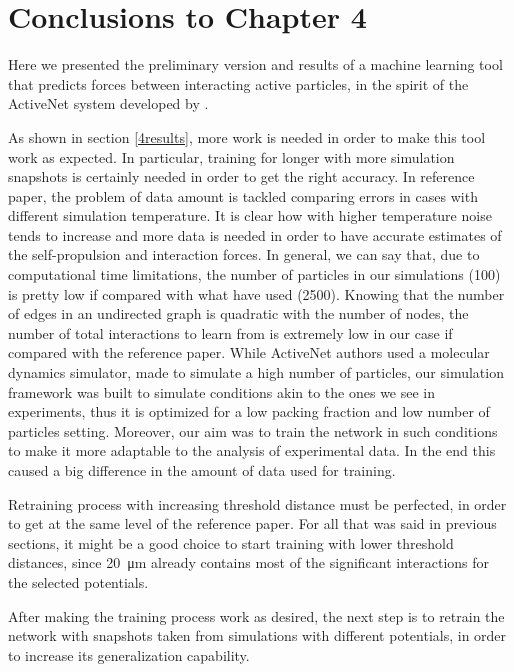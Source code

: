 \documentclass[../../master_thesis_np.tex]{subfiles}
\begin{document}
\section{Conclusions to Chapter 4}

Here we presented the preliminary version and results of a machine learning tool that predicts forces between interacting active particles, in the spirit of the ActiveNet system developed by \citeauthor{ruiz-garcia_discovering_2024}.

As shown in section \ref{4results}, more work is needed in order to make this tool work as expected.
In particular, training for longer with more simulation snapshots is certainly needed in order to get the right accuracy.
In reference paper, the problem of data amount is tackled comparing errors in cases with different simulation temperature.
It is clear how with higher temperature noise tends to increase and more data is needed in order to have accurate estimates of the self-propulsion and interaction forces.
In general, we can say that, due to computational time limitations, the number of particles in our simulations (100) is pretty low if compared with what \citeauthor{ruiz-garcia_discovering_2024} have used (2500).
Knowing that the number of edges in an undirected graph is quadratic with the number of nodes, the number of total interactions to learn from is extremely low in our case if compared with the reference paper.
While ActiveNet authors used a molecular dynamics simulator, made to simulate a high number of particles, our simulation framework was built to simulate conditions akin to the ones we see in experiments, thus it is optimized for a low packing fraction and low number of particles setting.
Moreover, our aim was to train the network in such conditions to make it more adaptable to the analysis of experimental data.
In the end this caused a big difference in the amount of data used for training.

Retraining process with increasing threshold distance must be perfected, in order to get at the same level of the reference paper.
For all that was said in previous sections, it might be a good choice to start training with lower threshold distances, since \SI{20}{\um} already contains most of the significant interactions for the selected potentials. 

After making the training process work as desired, the next step is to retrain the network with snapshots taken from simulations with different potentials, in order to increase its generalization capability.
\end{document}
